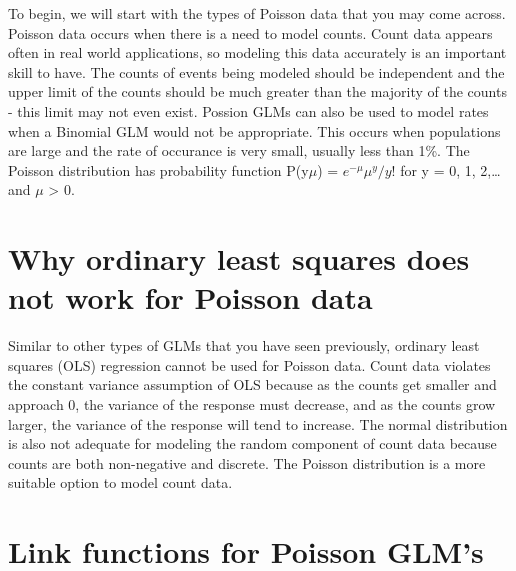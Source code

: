 \documentclass[
]{book}
\begin{document}
To begin, we will start with the types of Poisson data that you may come across. Poisson data occurs when there is a need to model counts. Count data appears often in real world applications, so modeling this data accurately is an important skill to have. The counts of events being modeled should be independent and the upper limit of the counts should be much greater than the majority of the counts - this limit may not even exist. Possion GLMs can also be used to model rates when a Binomial GLM would not be appropriate. This occurs when populations are large and the rate of occurance is very small, usually less than 1\%. The Poisson distribution has probability function P(y\textbar{}\(\mu\)) = \(e^{-\mu}\mu^y/y!\) for y = 0, 1, 2,\ldots{} and \(\mu\) \textgreater{} 0.

\hypertarget{why-ordinary-least-squares-does-not-work-for-poisson-data}{%
\section{Why ordinary least squares does not work for Poisson data}\label{why-ordinary-least-squares-does-not-work-for-poisson-data}}

Similar to other types of GLMs that you have seen previously, ordinary least squares (OLS) regression cannot be used for Poisson data. Count data violates the constant variance assumption of OLS because as the counts get smaller and approach 0, the variance of the response must decrease, and as the counts grow larger, the variance of the response will tend to increase. The normal distribution is also not adequate for modeling the random component of count data because counts are both non-negative and discrete. The Poisson distribution is a more suitable option to model count data.

\hypertarget{link-functions-for-poisson-glms}{%
\section{Link functions for Poisson GLM's}\label{link-functions-for-poisson-glms}}
\end{document}

